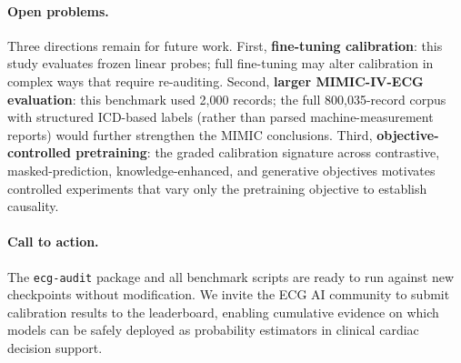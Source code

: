 \paragraph{Open problems.}
Three directions remain for future work. First, \textbf{fine-tuning calibration}: this
study evaluates frozen linear probes; full fine-tuning may alter calibration in complex
ways that require re-auditing. Second, \textbf{larger MIMIC-IV-ECG evaluation}: this
benchmark used 2{,}000 records; the full 800{,}035-record corpus with structured ICD-based
labels (rather than parsed machine-measurement reports) would further strengthen the MIMIC
conclusions. Third, \textbf{objective-controlled pretraining}: the graded calibration
signature across contrastive, masked-prediction, knowledge-enhanced, and generative
objectives motivates controlled experiments that vary only the pretraining objective to
establish causality.

\paragraph{Call to action.}
The \texttt{ecg-audit} package and all benchmark scripts are ready to run against new
checkpoints without modification. We invite the ECG AI community to submit calibration
results to the leaderboard, enabling cumulative evidence on which models can be safely
deployed as probability estimators in clinical cardiac decision support.

